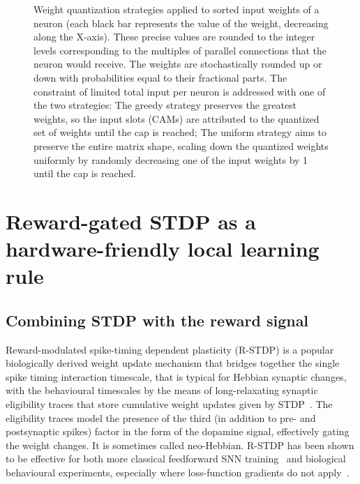\begin{figure}[t!]
\begin{subfigure}{.44\textwidth}
\caption{}
\label{fig:quantization_uniform}
\end{subfigure}
\caption[Weight quantization strategies]{Weight quantization strategies applied to sorted input weights of a neuron (each black bar represents the value of the weight, decreasing along the X-axis). These precise values are rounded to the integer levels corresponding to the multiples of parallel connections that the neuron would receive. The weights are stochastically rounded up or down with probabilities equal to their fractional parts. The constraint of limited total input per neuron is addressed with one of the two strategies:  The greedy strategy preserves the greatest weights, so the input slots (CAMs) are attributed to the quantized set of weights until the cap is reached;  The uniform strategy aims to preserve the entire matrix shape, scaling down the quantized weights uniformly by randomly decreasing one of the input weights by 1 until the cap is reached.}
\label{fig:weight_quantization_strategies}
\end{figure}




\newpage
\section{Reward-gated STDP as a hardware-friendly local learning rule}
\label{sec:RSTDP}

\subsection{Combining STDP with the reward signal}

Reward-modulated spike-timing dependent plasticity (R-STDP) is a popular biologically derived weight update mechanism that bridges together the single spike timing interaction timescale, that is typical for Hebbian synaptic changes\cite{Bi_Poo98}, with the behavioural timescales by the means of long-relaxating synaptic eligibility traces that store cumulative weight updates given by STDP~\cite{Schultz97, Izhikevich07, Fremaux_Gerstner16}. The eligibility traces model the presence of the third (in addition to pre- and postsynaptic spikes) factor in the form of the dopamine signal, effectively gating the weight changes. It is sometimes called neo-Hebbian. R-STDP has been shown to be effective for both more classical feedforward SNN training~\cite{Mozafari_etal18} and biological behavioural experiments, especially where loss-function gradients do not apply~\cite{Izhikevich07,Vasilaki09,Gerstner_etal18}.

